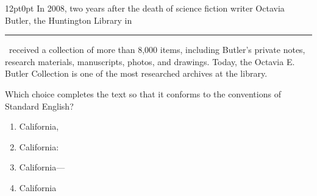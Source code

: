 \documentclass[11pt, twocolumn]{article}
\newcounter{questionnum}
\begin{document}
\vspace{6pt}\noindent
\begin{minipage}{\columnwidth}\raggedright
\noindent{}\par\vspace{8pt}
\begin{adjustwidth}{12pt}{0pt}
In 2008, two years after the death of science fiction writer Octavia Butler, the Huntington Library in \,\rule{2cm}{0.4pt}\, received a collection of more than 8,000 items, including Butler's private notes, research materials, manuscripts, photos, and drawings. Today, the Octavia E. Butler Collection is one of the most researched archives at the library.
\vspace{6pt}

Which choice completes the text so that it conforms to the conventions of Standard English?
\begin{enumerate}[label=\Alph*),leftmargin=18pt,topsep=3pt,itemsep=2pt]
  \item California,
  \item California:
  \item California---
  \item California
\end{enumerate}
\end{adjustwidth}
\end{minipage}\par
\end{document}
